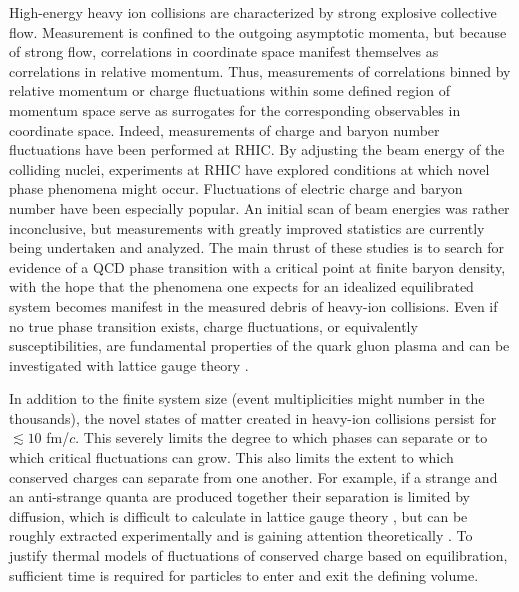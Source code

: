 High-energy heavy ion collisions are characterized by strong explosive collective flow. Measurement is confined to the outgoing asymptotic momenta, but because of strong flow, correlations in coordinate space manifest themselves as correlations in relative momentum. Thus, measurements of correlations binned by relative momentum or charge fluctuations within some defined region of momentum space serve as surrogates for the corresponding observables in coordinate space. Indeed, measurements of charge and baryon number fluctuations have been performed at RHIC. By adjusting the beam energy of the colliding nuclei, experiments at RHIC have explored conditions at which novel phase phenomena might occur. Fluctuations of electric charge and baryon number have been especially popular. An initial scan of beam energies \cite{Abelev:2008jg,Sarkar:2014fja,Xu:2016hxf,Thader:2016gpa,Luo:2012kja,Tarnowsky:2011vk,Aggarwal:2010wy,Chatterjee:2019msq,Adam:2019xmk,Adamczyk:2014fia,Sarkar:2013qla,Luo:2013saa,Sahoo:2012pfx,Luo:2011ts,Sahoo:2011at,R.Sahoo:2011qtk,Nayak:2009wc,McDonald:2012ts,McDonald:2013aoa,Adam:2020unf,Adamczyk:2017wsl} was rather inconclusive, but measurements with greatly improved statistics are currently being undertaken and analyzed. The main thrust of these studies is to search for evidence of a QCD phase transition with a critical point at finite baryon density, with the hope that the phenomena one expects for an idealized equilibrated system \cite{Stephanov:1998dy,Stephanov:1999zu} becomes manifest in the measured debris of heavy-ion collisions. Even if no true phase transition exists, charge fluctuations, or equivalently susceptibilities, are fundamental properties of the quark gluon plasma and can be investigated with lattice gauge theory \cite{Borsanyi:2011sw}.

In addition to the finite system size (event multiplicities might number in the thousands), the novel states of matter created in heavy-ion collisions persist for $\lesssim 10$ fm/$c$. This severely limits the degree to which phases can separate or to which critical fluctuations can grow. This also limits the extent to which conserved charges can separate from one another. For example, if a strange and an anti-strange quanta are produced together their separation is limited by diffusion, which is difficult to calculate in lattice gauge theory \cite{Aarts:2014nba,Amato:2013naa}, but can be roughly extracted experimentally and is gaining attention theoretically \cite{Aziz:2004qu,Kapusta:2014dja,Kapusta:2017hfi,Hammelmann:2018ath}. To justify thermal models of fluctuations of conserved charge based on equilibration, sufficient time is required for particles to enter and exit the defining volume.

